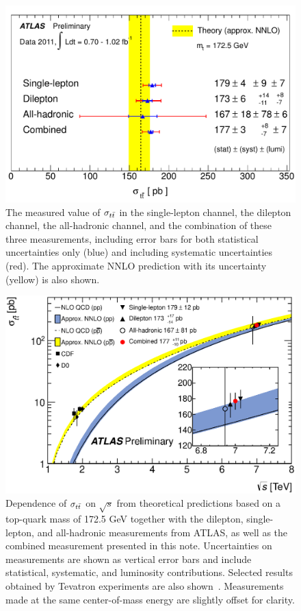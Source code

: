 \begin{figure}[ht!]
  \begin{center}
    \includegraphics[width=.8\textwidth]{figures/comb/summary_summary_atlprelim}
    \caption{The measured value of $\sigma_{t\bar{t}}$ in the single-lepton channel, the dilepton channel, the all-hadronic channel, and the combination of these three measurements, including error bars for both statistical uncertainties only (blue) and including systematic uncertainties (red).  The approximate NNLO prediction with its uncertainty (yellow) is also shown.}
    \label{fig:summary_summary}
  \end{center}
\end{figure}


\begin{figure}[ht!]
  \begin{center}
    \includegraphics[width=.8\textwidth]{figures/comb/top_crosssection_rootS.eps}
    \caption{Dependence of $\sigma_{t\bar{t}}$ on $\sqrt{s}$ from theoretical predictions based on a top-quark mass of 172.5 GeV together with the dilepton, single-lepton, and all-hadronic measurements from ATLAS, as well as the combined measurement presented in this note.  Uncertainties on measurements are shown as vertical error bars and include statistical, systematic, and luminosity contributions.  Selected results obtained by Tevatron experiments are also shown~\cite{CDF1p8,CDF2p7,D01p8,D04p3}. Measurements made at the same center-of-mass energy are slightly offset for clarity. }
    \label{fig:xsec_vs_roots}
  \end{center}
\end{figure}


